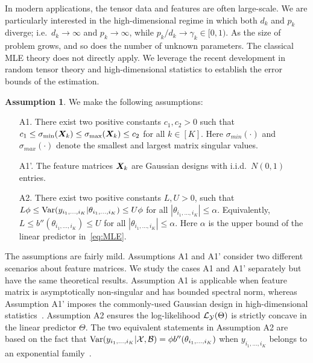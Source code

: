 \documentclass[12pt]{article}
\theoremstyle{definition}
\theoremstyle{definition}
\newtheorem{assumption}{Assumption}
\begin{document}
In modern applications, the tensor data and features are often large-scale. We are particularly interested in the high-dimensional regime in which both $d_k$ and $p_k$ diverge; i.e.\ $d_k\to \infty$ and $p_k\to\infty$, while $p_k/d_k \to \gamma_k \in[0,1)$. As the size of problem grows, and so does the number of unknown parameters. The classical MLE theory does not directly apply. We leverage the recent development in random tensor theory and high-dimensional statistics to establish the error bounds of the estimation. 

 
\begin{assumption}\label{ass}We make the following assumptions:
\begin{enumerate}
\item [A1.] There exist two positive constants $c_1, c_2>0$ such that $c_1\leq \sigma_{\min}(\bm X_k)\leq  \sigma_{\max}(\bm X_k)\leq c_2$ for all $k\in[K]$. Here $\sigma_{min}(\cdot)$ and $\sigma_{max}(\cdot)$ denote the smallest and largest matrix singular values.
\item [A1'.] The feature matrices $\bm X_k$ are Gaussian designs with i.i.d.\ $N(0,1)$ entries.
\item [A2.] There exist two positive constants $L, U>0$, such that $L\phi \leq \textup{Var}(y_{i_1,\ldots,i_K}|\theta_{i_1,\ldots,i_K})\leq U\phi $ for all $|\theta_{i_1,\ldots,i_K}|\leq \alpha$. Equivalently, $L\leq b''(\theta_{i_1,\ldots,i_K}) \leq U$ for all $|\theta_{i_1,\ldots,i_K}|\leq \alpha$. Here $\alpha$ is the upper bound of the linear predictor in~\eqref{eq:MLE}. 

\end{enumerate}
\end{assumption}
The assumptions are fairly mild. Assumptions A1 and A1' consider two different scenarios about feature matrices. We study the cases A1 and A1' separately but have the same theoretical results. Assumption A1 is applicable when feature matrix is asymptotically non-singular and has bounded spectral norm, whereas Assumption A1' imposes the commonly-used Gaussian design in high-dimensional statistics~\citep{chen2019non}. Assumption A2 ensures the log-likelihood $\mathcal{L}_{\mathcal{Y}}(\Theta)$ is strictly concave in the linear predictor $\Theta$. The two equivalent statements in Assumption A2 are based on the fact that $\textup{Var}(y_{i_1,\ldots,i_K}|\mathcal{X},\mathcal{B})=\phi b''(\theta_{i_1,\ldots,i_K})$ when $y_{i_1,\ldots,i_K}$ belongs to an exponential family~\citep{mccullagh1989generalized}. 
\end{document}
